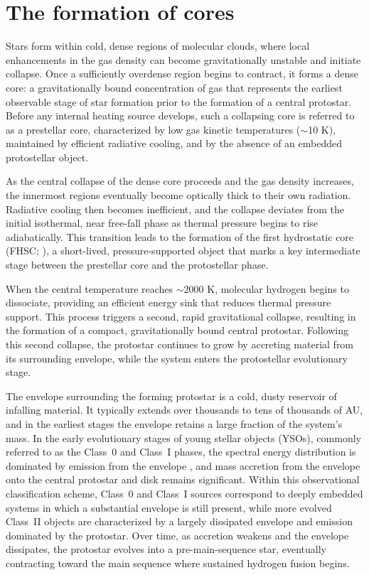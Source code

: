 \section{The formation of cores}
Stars form within cold, dense regions of molecular clouds, where local enhancements in the gas density can become gravitationally unstable and initiate collapse. Once a sufficiently overdense region begins to contract, it forms a dense core: a gravitationally bound concentration of gas that represents the earliest observable stage of star formation prior to the formation of a central protostar. Before any internal heating source develops, such a collapsing core is referred to as a prestellar core, characterized by low gas kinetic temperatures ($\sim$10 K), maintained by efficient radiative cooling, and by the absence of an embedded protostellar object.

As the central collapse of the dense core proceeds and the gas density increases, the innermost regions eventually become optically thick to their own radiation. Radiative cooling then becomes inefficient, and the collapse deviates from the initial isothermal, near free-fall phase as thermal pressure begins to rise adiabatically. This transition leads to the formation of the first hydrostatic core (FHSC; \citealt{Larson_1969}), a short-lived, pressure-supported object that marks a key intermediate stage between the prestellar core and the protostellar phase.

When the central temperature reaches $\sim$2000 K, molecular hydrogen begins to dissociate, providing an efficient energy sink that reduces thermal pressure support. This process triggers a second, rapid gravitational collapse, resulting in the formation of a compact, gravitationally bound central protostar. Following this second collapse, the protostar continues to grow by accreting material from its surrounding envelope, while the system enters the protostellar evolutionary stage.

The envelope surrounding the forming protostar is a cold, dusty reservoir of infalling material. It typically extends over thousands to tens of thousands of AU, and in the earliest stages the envelope retains a large fraction of the system's mass. In the early evolutionary stages of young stellar objects (YSOs), commonly referred to as the Class~0 and Class~I phases, the spectral energy distribution is dominated by emission from the envelope \citep[]{Andre_1993, Evans_2009}, and mass accretion from the envelope onto the central protostar and disk remains significant. Within this observational classification scheme, Class~0 and Class~I sources correspond to deeply embedded systems in which a substantial envelope is still present, while more evolved Class~II objects are characterized by a largely dissipated envelope and emission dominated by the protostar. Over time, as accretion weakens and the envelope dissipates, the protostar evolves into a pre-main-sequence star, eventually contracting toward the main sequence where sustained hydrogen fusion begins.

